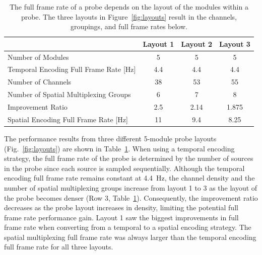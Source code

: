     \begin{table}%
        \centering
        \caption{The full frame rate of a probe depends on the layout of the modules within a probe. The three layouts in Figure~\ref{fig:layouts} result in the channels, groupings, and full frame rates below.}
        \label{tab:layouts}
        \begin{tabular}{lccc}
        \hline
        \multicolumn{1}{r}{}                       & Layout 1 & Layout 2 & Layout 3 \\ \hline
        Number of Modules                          & 5        & 5        & 5        \\
        Temporal Encoding Full Frame Rate {[}Hz{]} & 4.4      & 4.4      & 4.4      \\
        Number of Channels                         & 38       & 53       & 55       \\
        Number of Spatial Multiplexing Groups      & 6        & 7        & 8        \\
        Improvement Ratio                          & 2.5      & 2.14     & 1.875    \\
        Spatial Encoding Full Frame Rate {[}Hz{]}  & 11       & 9.4      & 8.25     \\ \hline
        \end{tabular}
    \end{table}
The performance results from three different 5-module probe layouts (Fig.~\ref{fig:layouts}) are shown in Table~\ref{tab:layouts}. When using a temporal encoding strategy, the full frame rate of the probe is determined by the number of sources in the probe since each source is sampled sequentially. Although the temporal encoding full frame rate remains constant at 4.4~Hz, the channel density and the number of spatial multiplexing groups increase from layout 1 to 3 as the layout of the probe becomes denser (Row 3, Table~\ref{tab:layouts}). Consequently, the improvement ratio decreases as the probe layout increases in density, limiting the potential full frame rate performance gain. Layout 1 saw the biggest improvements in full frame rate when converting from a temporal to a spatial encoding strategy. The spatial multiplexing full frame rate was always larger than the temporal encoding full frame rate for all three layouts.  


